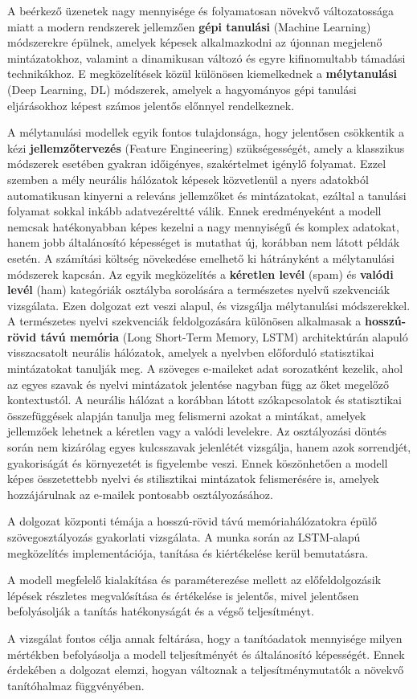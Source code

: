 A beérkező üzenetek nagy mennyisége és folyamatosan növekvő változatossága miatt a modern rendszerek jellemzően 
\textbf{gépi tanulási} (Machine Learning) módszerekre épülnek, amelyek képesek alkalmazkodni az újonnan megjelenő mintázatokhoz, 
valamint a dinamikusan változó és egyre kifinomultabb támadási technikákhoz. E megközelítések közül különösen kiemelkednek a 
\textbf{mélytanulási} (Deep Learning, DL) módszerek, amelyek a hagyományos gépi tanulási eljárásokhoz képest számos jelentős előnnyel rendelkeznek.

A mélytanulási modellek egyik fontos tulajdonsága, hogy jelentősen csökkentik a kézi \textbf{jellemzőtervezés} (Feature Engineering) szükségességét, 
amely a klasszikus módszerek esetében gyakran időigényes, szakértelmet igénylő folyamat. 
Ezzel szemben a mély neurális hálózatok képesek közvetlenül a nyers adatokból automatikusan kinyerni a releváns jellemzőket és mintázatokat, 
ezáltal a tanulási folyamat sokkal inkább adatvezéreltté válik.
Ennek eredményeként a modell nemcsak hatékonyabban képes kezelni a nagy mennyiségű és komplex adatokat, hanem jobb általánosító képességet is mutathat új, 
korábban nem látott példák esetén. A számítási költség növekedése emelhető ki hátrányként a mélytanulási módszerek kapcsán.
Az egyik megközelítés a \textbf{kéretlen levél} (spam) és \textbf{valódi levél} (ham) kategóriák osztályba sorolására a természetes nyelvű szekvenciák vizsgálata. 
Ezen dolgozat ezt veszi alapul, és vizsgálja mélytanulási módszerekkel. 
A természetes nyelvi szekvenciák feldolgozására különösen alkalmasak a \textbf{hosszú-rövid távú memória} (Long Short-Term Memory, LSTM) 
architektúrán alapuló visszacsatolt neurális hálózatok, amelyek a nyelvben előforduló statisztikai mintázatokat tanulják meg. 
A szöveges e-maileket adat sorozatként kezelik, ahol az egyes szavak és nyelvi mintázatok jelentése nagyban függ az őket megelőző kontextustól. 
A neurális hálózat a korábban látott szókapcsolatok és statisztikai összefüggések alapján tanulja meg felismerni azokat a mintákat, 
amelyek jellemzőek lehetnek a kéretlen vagy a valódi levelekre. 
Az osztályozási döntés során nem kizárólag egyes kulcsszavak jelenlétét vizsgálja, hanem azok sorrendjét, gyakoriságát és környezetét is figyelembe veszi. 
Ennek köszönhetően a modell képes összetettebb nyelvi és stilisztikai mintázatok felismerésére is, amelyek hozzájárulnak az e-mailek pontosabb osztályozásához.

A dolgozat központi témája a hosszú-rövid távú memóriahálózatokra épülő szövegosztályozás gyakorlati vizsgálata. A munka során az LSTM-alapú megközelítés implementációja, tanítása és kiértékelése kerül bemutatásra.

A modell megfelelő kialakítása és paraméterezése mellett az előfeldolgozásik lépések részletes megvalósítása és értékelése is jelentős, mivel jelentősen befolyásolják a tanítás hatékonyságát és a végső teljesítményt.

A vizsgálat fontos célja annak feltárása, hogy a tanítóadatok mennyisége milyen mértékben befolyásolja a modell teljesítményét és általánosító képességét. Ennek érdekében a dolgozat elemzi, hogyan változnak a teljesítménymutatók a növekvő tanítóhalmaz függvényében.
